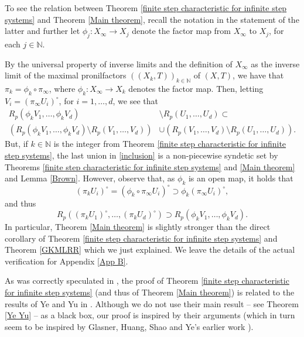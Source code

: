 \documentclass[reqno]{amsart}
\def\N{{\mathbb N}}
\theoremstyle{definition}
\theoremstyle{remark}
\def\N{{\mathbb N}}
\begin{document}
To see the relation between Theorem \ref{finite step characteristic for infinite step systems} 
and Theorem \ref{Main theorem}, recall the 
notation in the statement of the latter and 
further let $\phi_j:X_{\infty}\to X_j$ denote 
the factor map from $X_{\infty}$ 
to $X_j$, for each $j\in \N$.   

By the universal property of 
inverse limits and the definition 
of $X_{\infty}$ as the inverse 
limit of the maximal pronilfactors 
$((X_k,T))_{k\in \N}$ of $(X,T)$, 
we have that $\pi_k=\phi_k \circ \pi_{\infty}$, 
where $\phi_k: X_{\infty} \to X_k$ denotes the 
factor map. Then, letting $V_i=(\pi_{\infty}U_i)^{\circ}$, for $i=1,\ldots,d$, we see that
\begin{align}\label{inclusion} R_p(\phi_k V_1,\ldots,\phi_k V_d) & \setminus R_p(U_1,\ldots,U_d)  \subset \nonumber \\
\left( R_p(\phi_k V_1,\ldots,\phi_k V_d) \setminus R_p(V_1,\ldots,V_d)\right) & \cup  \left(  R_p(V_1,\ldots,V_d) \setminus R_p(U_1,\ldots,U_d) \right).    
\end{align}
But, if $k\in \N$ is the integer from Theorem \ref{finite step characteristic for infinite step systems}, the last union in \eqref{inclusion} is a 
non-piecewise syndetic set by Theorems \ref{finite step characteristic for infinite step systems} and \ref{Main theorem} and Lemma \ref{Brown}. 
However, observe that, as $\phi_k$ is an open map, it holds that 
$$(\pi_kU_i)^{\circ}=(\phi_k\circ \pi_{\infty}U_i)^{\circ} \supset \phi_k(\pi_{\infty}U_i)^{\circ},$$
and thus
$$R_p((\pi_k U_1)^{\circ},\ldots,(\pi_k U_d)^{\circ}) \supset R_p(\phi_k V_1,\ldots,\phi_k V_d).$$
In particular, Theorem \ref{Main theorem} is 
slightly stronger than the direct corollary of Theorem \ref{finite step characteristic for infinite step systems} and Theorem \ref{GKMLRR} which we just explained. We leave the details of the actual verification for Appendix \ref{App B}.


As was correctly speculated in \cite[Section 5.1]{GKLMRR}, the proof of Theorem 
\ref{finite step characteristic for infinite step systems} (and thus of Theorem \ref{Main theorem}) is
related to the results of Ye and Yu in \cite{Ye_Yu}. Although we do not 
use their main result -- see Theorem \ref{Ye Yu} -- as a black box, 
our proof is inspired by their arguments (which in turn seem 
to be inspired by Glasner, Huang, Shao and Ye's earlier work 
\cite{Glasner_Huang_Shao_Ye_regionally_arithmetic_prog_nil:2020}). 
\end{document}
